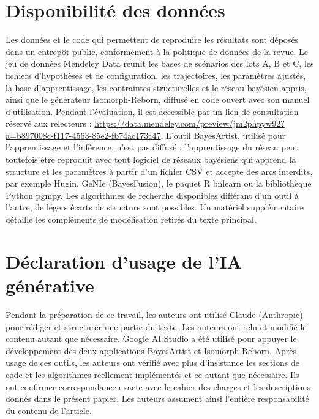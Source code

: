 
\section*{Disponibilité des données}

Les données et le code qui permettent de reproduire les résultats sont déposés dans un entrepôt public, conformément à la politique de données de la revue. Le jeu de données Mendeley Data \citep{screborn2026data} réunit les bases de scénarios des lots A, B et C, les fichiers d'hypothèses et de configuration, les trajectoires, les paramètres ajustés, la base d'apprentissage, les contraintes structurelles et le réseau bayésien appris, ainsi que le générateur Isomorph-Reborn, diffusé en code ouvert avec son manuel d'utilisation. Pendant l'évaluation, il est accessible par un lien de consultation réservé aux relecteurs : \url{https://data.mendeley.com/preview/jm2phpyw92?a=b897008c-f117-4563-85e2-fb74ac173c47}. L'outil BayesArtist, utilisé pour l'apprentissage et l'inférence, n'est pas diffusé ; l'apprentissage du réseau peut toutefois être reproduit avec tout logiciel de réseaux bayésiens qui apprend la structure et les paramètres à partir d'un fichier CSV et accepte des arcs interdits, par exemple Hugin, GeNIe (BayesFusion), le paquet R bnlearn ou la bibliothèque Python pgmpy. Les algorithmes de recherche disponibles différant d'un outil à l'autre, de légers écarts de structure sont possibles. Un matériel supplémentaire détaille les compléments de modélisation retirés du texte principal.

\section*{Déclaration d'usage de l'IA générative}

Pendant la préparation de ce travail, les auteurs ont utilisé Claude (Anthropic) pour rédiger et structurer une partie du texte. Les auteurs ont relu et modifié le contenu autant que nécessaire. Google AI Studio a été utilisé pour appuyer le développement des deux applications BayesArtist et Isomorph-Reborn. Après usage de ces outils, les auteurs ont vérifié avec plus d'insistance les sections de code et les algorithmes réellement implémentés et ce autant que nécessaire. Ils ont confirmer correspondance exacte avec le cahier des charges et les descriptions donnés dans le présent papier. Les auteurs assument ainsi l'entière responsabilité du contenu de l'article.

